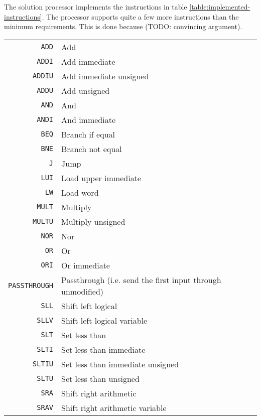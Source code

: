 The solution processor implements the instructions in table \ref{table:implemented-instructions}.
The processor supports quite a few more instructions than the minimum requirements.
This is done because (TODO: convincing argument).

\begin{table}
    \begin{center}
        \begin{tabular}{r|l}
            \texttt{ADD} & Add \\
            \texttt{ADDI} & Add immediate \\
            \texttt{ADDIU} & Add immediate unsigned \\
            \texttt{ADDU} & Add unsigned \\
            \texttt{AND} & And \\
            \texttt{ANDI} & And immediate \\
            \texttt{BEQ} & Branch if equal \\
            \texttt{BNE} & Branch not equal \\
            \texttt{J} & Jump \\
            \texttt{LUI} & Load upper immediate \\
            \texttt{LW} & Load word \\
            \texttt{MULT} & Multiply \\
            \texttt{MULTU} & Multiply unsigned \\
            \texttt{NOR} & Nor \\
            \texttt{OR} & Or \\
            \texttt{ORI} & Or immediate \\
            \texttt{PASSTHROUGH} & Passthrough (i.e. send the first input through unmodified) \\
            \texttt{SLL} & Shift left logical \\
            \texttt{SLLV} & Shift left logical variable \\
            \texttt{SLT} & Set less than \\
            \texttt{SLTI} & Set less than immediate \\
            \texttt{SLTIU} & Set less than immediate unsigned \\
            \texttt{SLTU} & Set less than unsigned \\
            \texttt{SRA} & Shift right arithmetic \\
            \texttt{SRAV} & Shift right arithmetic variable \\

\end{tabular}
\end{center}
\end{table}
